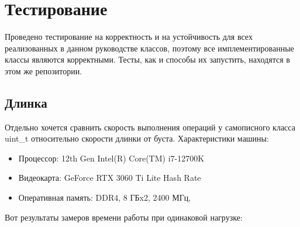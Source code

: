 
\section{Тестирование}
Проведено тестирование на корректность и на устойчивость для всех реализованных в данном руководстве классов, поэтому все имплементированные классы являются корректными. Тесты, как и способы их запустить, находятся в этом же репозитории.

\subsection{Длинка}
Отдельно хочется сравнить скорость выполнения операций у самописного класса uint\_t относительно скорости длинки от буста. Характеристики машины:
\begin{itemize}
  \item Процессор: 12th Gen Intel(R) Core(TM) i7-12700K
  \item Видеокарта: GeForce RTX 3060 Ti Lite Hash Rate
  \item Оперативная память: DDR4, 8 ГБx2, 2400 МГц,
\end{itemize}
Вот результаты замеров времени работы при одинаковой нагрузке:

